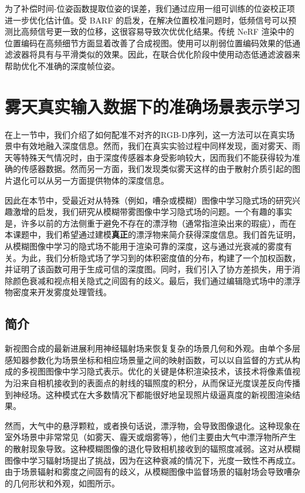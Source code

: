 为了补偿时间-位姿函数提取位姿的误差，我们通过应用一组可训练的位姿校正项进一步优化估计值。受 BARF\cite{lin_barf_2021} 的启发，在解决位置校准问题时，低频信号可以预测比高频信号更一致的位移，这很容易导致次优优化结果。传统 NeRF 渲染中的位置编码在高频细节方面显着改善了合成视图。使用可以削弱位置编码效果的低通滤波器将具有与平滑类似的效果。因此，在联合优化阶段中使用动态低通滤波器来帮助优化不准确的深度帧位姿。

\newpage
\section{雾天真实输入数据下的准确场景表示学习}
在上一节中，我们介绍了如何配准不对齐的RGB-D序列，这一方法可以在真实场景中有效地融入深度信息。然而，我们在真实实验过程中同样发现，面对雾天、雨天等特殊天气情况时，由于深度传感器本身受影响较大，因而我们不能获得较为准确的传感器数据。然而另一方面，我们发现类似雾天这样的由于散射介质引起的图片退化可以从另一方面提供物体的深度信息。

因此在本节中，受最近对从特殊（例如，嘈杂或模糊）图像中学习隐式场的研究兴趣激增的启发，我们研究从模糊带雾图像中学习隐式场的问题。一个有趣的事实是，许多以前的方法侧重于避免不存在的漂浮物（通常指渲染出来的瑕疵），而在本课题中，我们希望通过建模\textbf{真正}的漂浮物来简介获得深度信息。我们首先证明，从模糊图像中学习的隐式场不能用于渲染可靠的深度，这与通过光衰减的雾度有关。为此，我们分析隐式场了学习到的体积密度值的分布，构建了一个加权函数，并证明了该函数可用于生成可信的深度图。同时，我们引入了协方差损失，用于消除颜色衰减和视点相关隐式之间固有的歧义。最后，我们通过编辑隐式场中的漂浮物密度来开发雾度处理管线。

\subsection{简介}
新视图合成的最新进展利用神经辐射场来恢复复杂的场景几何和外观。由单个多层感知器参数化为场景坐标和相应场景量之间的映射函数，可以以自监督的方式从构成的多视图图像中学习隐式表示。优化的关键是体积渲染技术，该技术将像素值视为沿来自相机接收到的表面点的射线的辐照度的积分，从而保证光度误差反向传播到神经场。这种模式在大多数情况下都能很好地呈现照片级逼真度的新视图渲染结果。

然而，大气中的悬浮颗粒，或者换句话说，漂浮物，会导致图像退化。这种现象在室外场景中非常常见（如雾天、霾天或烟雾等），他们主要由大气中漂浮物所产生的散射现象导致。这种模糊图像的退化导致相机接收到的辐照度减弱。这对从模糊图像中学习辐射场提出了挑战，因为在这种衰减的情况下，光度一致性不再成立。由于场景辐射和雾度之间固有的歧义，从模糊图像中监督场景的辐射场会导致嘈杂的几何形状和外观，如图所示。

